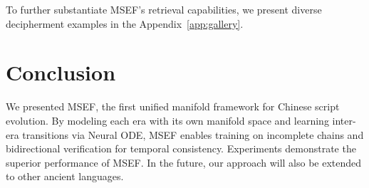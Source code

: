\documentclass{article}
\newcommand{\cg}[1]{\begin{CJK*}{UTF8}{gbsn}#1\end{CJK*}}
\begin{document}
To further substantiate MSEF's retrieval capabilities, we present diverse decipherment examples in the Appendix~\ref{app:gallery}.






\section{Conclusion}
We presented MSEF, the first unified manifold framework for Chinese script evolution. By modeling each era with its own manifold space and learning inter-era transitions via Neural ODE, MSEF enables training on incomplete chains and bidirectional verification for temporal consistency. Experiments demonstrate the superior performance of MSEF. In the future, our approach will also be extended to other ancient languages.

\clearpage

\end{document}
